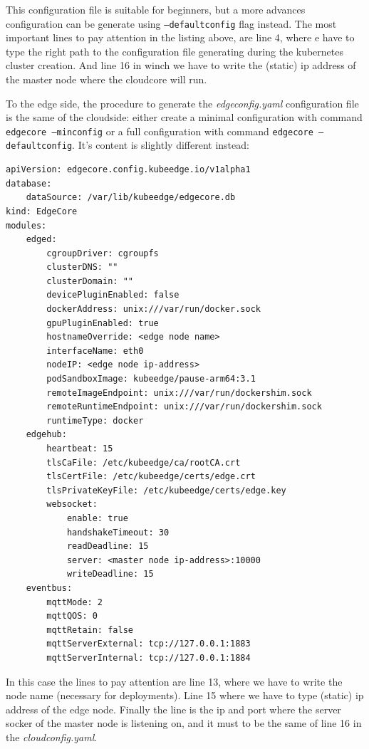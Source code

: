 This configuration file is suitable for beginners, but a more advances configuration can be generate using \texttt{--defaultconfig} flag instead.
The most important lines to pay attention in the listing above, are line 4, where e have to type the right path to the configuration file generating during the kubernetes cluster creation. And line 16 in winch we have to write the (static) ip address of the master node where the cloudcore will run.

To the edge side, the procedure to generate the \textit{edgeconfig.yaml} configuration file is the same of the cloudside: either create a minimal configuration with command \texttt{edgecore --minconfig} or a full configuration with command \texttt{edgecore --defaultconfig}. It's content is slightly different instead:


\begin{verbatim}
apiVersion: edgecore.config.kubeedge.io/v1alpha1
database:
    dataSource: /var/lib/kubeedge/edgecore.db
kind: EdgeCore
modules:
    edged:
        cgroupDriver: cgroupfs
        clusterDNS: ""
        clusterDomain: ""
        devicePluginEnabled: false
        dockerAddress: unix:///var/run/docker.sock
        gpuPluginEnabled: true
        hostnameOverride: <edge node name>
        interfaceName: eth0
        nodeIP: <edge node ip-address>
        podSandboxImage: kubeedge/pause-arm64:3.1
        remoteImageEndpoint: unix:///var/run/dockershim.sock
        remoteRuntimeEndpoint: unix:///var/run/dockershim.sock
        runtimeType: docker
    edgehub:
        heartbeat: 15
        tlsCaFile: /etc/kubeedge/ca/rootCA.crt
        tlsCertFile: /etc/kubeedge/certs/edge.crt
        tlsPrivateKeyFile: /etc/kubeedge/certs/edge.key
        websocket:
            enable: true
            handshakeTimeout: 30
            readDeadline: 15
            server: <master node ip-address>:10000
            writeDeadline: 15
    eventbus:
        mqttMode: 2
        mqttQOS: 0
        mqttRetain: false
        mqttServerExternal: tcp://127.0.0.1:1883
        mqttServerInternal: tcp://127.0.0.1:1884
\end{verbatim}


In this case the lines to pay attention are line 13, where we have to write the node name (necessary for deployments). Line 15 where we have to type (static) ip address of the edge node. Finally the line is the ip and port where the server socker of the master node is listening on, and it must to be the same of line 16 in the \textit{cloudconfig.yaml}.

